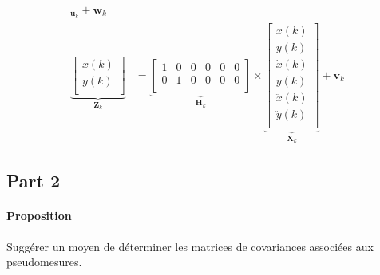 \documentclass{article}
\begin{document}
\begin{align*}
{    }_{\mathbf{u}_{k}} 
    + 
    \mathbf{w}_{k}\\
    \underbrace{
        \begin{bmatrix}
            x(k)\\
            y(k)\\
        \end{bmatrix}
    }_{\mathbf{Z}_{k}} 
    &= 
    \underbrace{
        \begin{bmatrix}
            1 & 0 & 0 & 0 & 0 & 0\\
            0 & 1 & 0 & 0 & 0 & 0\\
        \end{bmatrix}
    }_{\mathbf{H}_{k}} 
    \times 
    \underbrace{
        \begin{bmatrix}
            x(k)\\
            y(k)\\
            \dot{x}(k)\\
            \dot{y}(k)\\
            \ddot{x}(k)\\
            \ddot{y}(k)\\
        \end{bmatrix}
    }_{\mathbf{X}_{k}} 
    + 
    \mathbf{v}_{k}
\end{align*}


\subsection{Part 2}
\paragraph{Proposition}Suggérer un moyen de déterminer les matrices de covariances associées aux pseudomesures.
\end{document}
